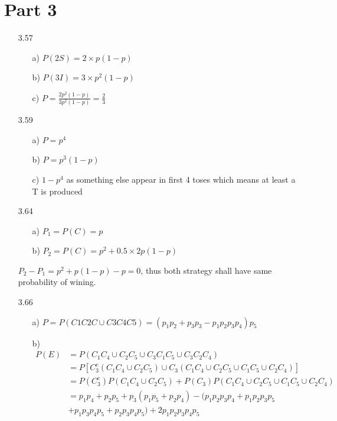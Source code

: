 \documentclass{article}
\begin{document}
\section*{Part 3}
\begin{itemize}
    \item [3.57]
    \begin{itemize}
        \item [a)] \(\displaystyle
        P(2S) = 2\times p(1-p)
        \)
        \item [b)]\(\displaystyle
        P(3I) = 3\times p^2(1-p)
        \)
        \item [c)]\(\displaystyle
        P = \frac{2p^2(1-p)}{3p^2(1-p)}=\frac{2}{3}
        \)
    \end{itemize}
    \item [3.59]
    \begin{itemize}
        \item [a)]\(\displaystyle
        P = p^4
        \)
        \item [b)]\(\displaystyle
        P = p^3(1-p)
        \)
        \item [c)]\(\displaystyle
        1-p^4
        \) as something else appear in first 4 toses which means at least a T is produced
    \end{itemize}
    \item [3.64]
    \begin{itemize}
        \item [a)]\(\displaystyle
        P_1 = P(C) = p
        \)
        \item [b)]\(\displaystyle
        P_2 = P(C) = p^2+0.5\times 2p(1-p)
        \)
    \end{itemize}
    \(P_2-P_1 = p^2+p(1-p)-p=0\), thus both strategy shall have same probability of wining.
    \item [3.66]
    \begin{itemize}
        \item [a)]\(P = P(C1C2C\cup C3C4C5) = (p_1p_2+p_3p_3-p_1p_2p_3p_4)p_5\) 
        \item [b)]\begin{align*}
P(E) &= P(C_1C_4 \cup C_2C_5 \cup C_3C_1C_5 \cup C_3C_2C_4)\\
&= P\left[C_3^c(C_1C_4 \cup C_2C_5) \cup C_3(C_1C_4 \cup C_2C_5 \cup C_1C_5 \cup C_2C_4)\right]\\
&= P(C_3^c)P(C_1C_4 \cup C_2C_5) + P(C_3)P(C_1C_4 \cup C_2C_5 \cup C_1C_5 \cup C_2C_4)\\
&=p_1p_4 + p_2p_5 + p_3(p_1p_5 + p_2p_4) - (p_1p_2p_3p_4 + p_1p_2p_3p_5 \\&+ p_1p_3p_4p_5 + p_2p_3p_4p_5) + 2p_1p_2p_3p_4p_5

\end{align*}
\end{itemize}
\end{itemize}
\end{document}
